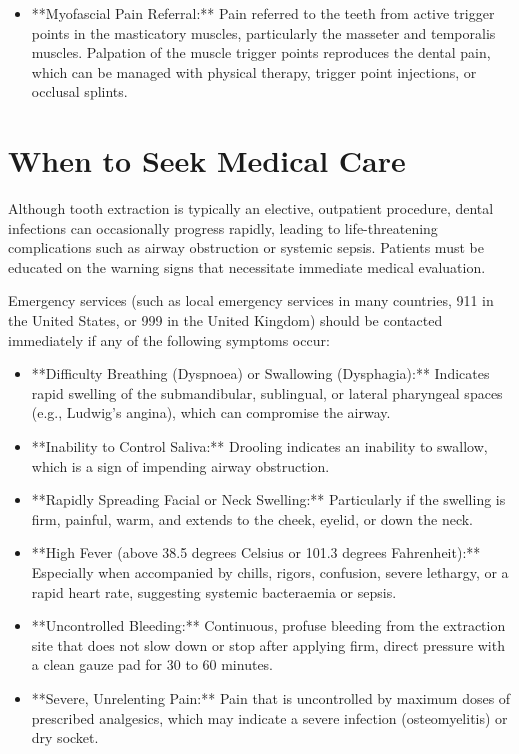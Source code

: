 \begin{itemize}
  \item **Myofascial Pain Referral:** Pain referred to the teeth from active trigger points in the masticatory muscles, particularly the masseter and temporalis muscles. Palpation of the muscle trigger points reproduces the dental pain, which can be managed with physical therapy, trigger point injections, or occlusal splints.
\end{itemize}

\section*{When to Seek Medical Care}
Although tooth extraction is typically an elective, outpatient procedure, dental infections can occasionally progress rapidly, leading to life-threatening complications such as airway obstruction or systemic sepsis. Patients must be educated on the warning signs that necessitate immediate medical evaluation.

Emergency services (such as local emergency services in many countries, 911 in the United States, or 999 in the United Kingdom) should be contacted immediately if any of the following symptoms occur:
\begin{itemize}
  \item **Difficulty Breathing (Dyspnoea) or Swallowing (Dysphagia):** Indicates rapid swelling of the submandibular, sublingual, or lateral pharyngeal spaces (e.g., Ludwig's angina), which can compromise the airway.
  \item **Inability to Control Saliva:** Drooling indicates an inability to swallow, which is a sign of impending airway obstruction.
  \item **Rapidly Spreading Facial or Neck Swelling:** Particularly if the swelling is firm, painful, warm, and extends to the cheek, eyelid, or down the neck.
  \item **High Fever (above 38.5 degrees Celsius or 101.3 degrees Fahrenheit):** Especially when accompanied by chills, rigors, confusion, severe lethargy, or a rapid heart rate, suggesting systemic bacteraemia or sepsis.
  \item **Uncontrolled Bleeding:** Continuous, profuse bleeding from the extraction site that does not slow down or stop after applying firm, direct pressure with a clean gauze pad for 30 to 60 minutes.
  \item **Severe, Unrelenting Pain:** Pain that is uncontrolled by maximum doses of prescribed analgesics, which may indicate a severe infection (osteomyelitis) or dry socket.
\end{itemize}

